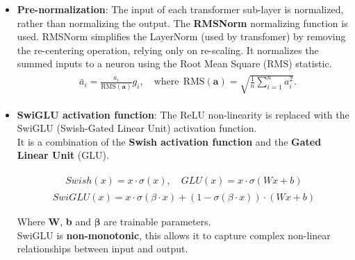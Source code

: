 \documentclass{article}
\begin{document}
		\begin{itemize}
		
			\item 
				\textbf{Pre-normalization}: The input of each transformer sub-layer is normalized, rather than normalizing the output. The \textbf{RMSNorm} normalizing function \cite{zhang2019rootmeansquarelayer} is used. RMSNorm simplifies the LayerNorm (used by transfomer) by removing the re-centering operation, relying only on re-scaling. It normalizes the summed inputs to a neuron using the Root Mean Square (RMS) statistic.
				\begin{align}\label{eq_rmsnorm}
					\begin{split}
						& \bar{a}_i = \frac{a_i}{\text{RMS}(\mathbf{a})} g_i, \quad \text{where}~~ \text{RMS}(\mathbf{a}) = \sqrt{\frac{1}{n} \sum_{i=1}^{n} a_i^2}.
					\end{split}
				\end{align}
			
			\item
				\textbf{SwiGLU activation function}: The ReLU non-linearity is replaced with the SwiGLU (Swish-Gated Linear Unit) activation function. \\
				It is a combination of the \textbf{Swish activation function} and the \textbf{Gated Linear Unit} (GLU).
				
				\begin{align}\label{eq_swish_func}
					\begin{split}
						Swish(x) = x \cdot \sigma(x),  \quad GLU(x) = x \cdot \sigma(Wx + b)
					\end{split}
				\end{align}
				\begin{align}
					SwiGLU(x) = x \cdot \sigma(\beta \cdot x) + (1 - \sigma(\beta \cdot x)) \cdot (Wx + b)
				\end{align}
				
				Where \textbf{W}, \textbf{b} and $\boldsymbol{\beta}$  are trainable parameters. \\
				SwiGLU is \textbf{non-monotonic}, this allows it to capture complex non-linear relationships between input and output.
			

\end{itemize}
\end{document}
